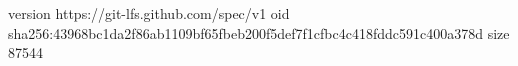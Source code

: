 version https://git-lfs.github.com/spec/v1
oid sha256:43968bc1da2f86ab1109bf65fbeb200f5def7f1cfbc4c418fddc591c400a378d
size 87544
